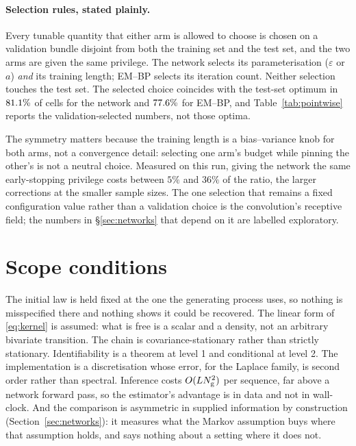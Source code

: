 \paragraph{Selection rules, stated plainly.} Every tunable quantity that either arm is allowed to
choose is chosen on a validation bundle disjoint from both the training set and the test set, and
the two arms are given the same privilege. The network selects its parameterisation
($\varepsilon$ or $a$) \emph{and} its training length; EM--BP selects its iteration count. Neither
selection touches the test set. The selected choice coincides with the test-set optimum in
$81.1\%$ of cells for the network and $77.6\%$ for EM--BP, and Table~\ref{tab:pointwise}
reports the validation-selected numbers, not those optima.

The symmetry matters because the training length is a bias--variance knob for both arms, not a
convergence detail: selecting one arm's budget while pinning the other's is not a neutral choice.
Measured on this run, giving the network the same early-stopping privilege costs between $5\%$ and
$36\%$ of the ratio, the larger corrections at the smaller sample sizes. The one selection that
remains a fixed configuration value rather than a validation choice is the convolution's receptive
field; the numbers in \S\ref{sec:networks} that depend on it are labelled exploratory.

\section{Scope conditions}
\label{app:limits}

The initial law is held fixed at the one the generating process uses, so nothing is misspecified
there and nothing shows it could be recovered. The linear form of \eqref{eq:kernel} is assumed:
what is free is a scalar and a density, not an arbitrary bivariate transition. The chain is
covariance-stationary rather than strictly stationary. Identifiability is a theorem at level 1 and
conditional at level 2. The implementation is a discretisation whose error, for the Laplace family,
is second order rather than spectral. Inference costs $O(LN_{\mathrm{g}}^{2})$ per sequence, far above
a network forward pass, so the estimator's advantage is in data and not in wall-clock. And the
comparison is asymmetric in supplied information by construction
(Section~\ref{sec:networks}): it measures what the Markov assumption buys where that assumption
holds, and says nothing about a setting where it does not.

